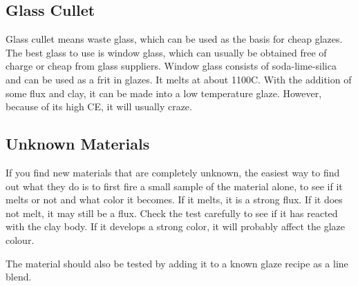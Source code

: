 \subsection{Glass Cullet}
Glass cullet means waste glass, which can be used as the basis for cheap 
glazes. The best glass to use is window glass, which can usually be obtained 
free of charge or cheap from glass suppliers. Window glass consists of 
soda-lime-silica and can be used as a frit in glazes. It melts at about 
1100\degree C. With the addition of some flux and clay, it can be made into a 
low temperature glaze. However, because of its high CE, it will usually craze.
\subsection{Unknown Materials}
If you find new materials that are completely unknown, the easiest way to find 
out what they do is to first fire a small sample of the material alone, to see 
if it melts or not and what color it becomes. If it melts, it is a strong flux. 
If it does not melt, it may still be a flux. Check the test carefully to see if 
it has reacted with the clay body. If it develops a strong color, it will 
probably affect the glaze colour.

The material should also be tested by adding it to a known glaze recipe as a 
line blend.
